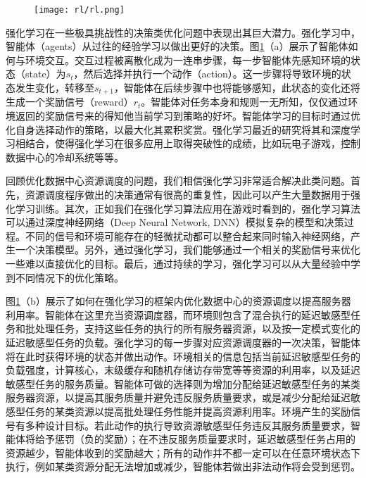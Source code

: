 \begin{figure}
  \centering
  \begin{minipage}[b]{0.7\textwidth}
    \centering
    \texttt{[image: rl/rl.png]}
    \label{fig:rl}
  \end{minipage}     
\end{figure}


强化学习在一些极具挑战性的决策类优化问题中表现出其巨大潜力\cite{mnih2013playing}\cite{silver2016mastering}。强化学习中，智能体（agents）从过往的经验学习以做出更好的决策。图\ref{fig:rl}（a）展示了智能体如何与环境交互。交互过程被离散化成为一连串步骤，每一步智能体先感知环境的状态（state）为$s_t$，然后选择并执行一个动作（action）。这一步骤将导致环境的状态发生变化，转移至$s_{t+1}$，智能体在后续步骤中也将能够感知，此状态的变化还将生成一个奖励信号（reward）$r_t$。智能体对任务本身和规则一无所知，仅仅通过环境返回的奖励信号来的得知他当前学习到策略的好坏\cite{bertsekas1995dynamic}。智能体学习的目标时通过优化自身选择动作的策略，以最大化其累积奖赏。强化学习最近的研究将其和深度学习相结合，使得强化学习在很多应用上取得突破性的成绩，比如玩电子游戏\cite{mnih2015human}，控制数据中心的冷却系统\cite{evans2016deepmind}等等。

回顾优化数据中心资源调度的问题，我们相信强化学习非常适合解决此类问题。首先，资源调度程序做出的决策通常有很高的重复性，因此可以产生大量数据用于强化学习训练。其次，正如我们在强化学习算法应用在游戏\cite{mnih2015human}\cite{evans2016deepmind}时看到的，强化学习算法可以通过深度神经网络（Deep Neural Network, DNN）模拟复杂的模型和决策过程。不同的信号和环境可能存在的轻微扰动都可以整合起来同时输入神经网络，产生一个决策模型。另外，通过强化学习，我们能够通过一个相关的奖励信号来优化一些难以直接优化的目标。最后，通过持续的学习，强化学习可以从大量经验中学到不同情况下的优化策略。

图\ref{fig:rl}（b）展示了如何在强化学习的框架内优化数据中心的资源调度以提高服务器利用率。智能体在这里充当资源调度器，而环境则包含了混合执行的延迟敏感型任务和批处理任务，支持这些任务的执行的所有服务器资源，以及按一定模式变化的延迟敏感型任务的负载。强化学习的每一步骤对应资源调度器的一次决策，智能体将在此时获得环境的状态并做出动作。环境相关的信息包括当前延迟敏感型任务的负载强度，计算核心，末级缓存和随机存储访存带宽等等资源的利用率，以及延迟敏感型任务的服务质量。智能体可做的选择则为增加分配给延迟敏感型任务的某类服务器资源，以提高其服务质量并避免违反服务质量要求，或是减少分配给延迟敏感型任务的某类资源以提高批处理任务性能并提高资源利用率。环境产生的奖励信号有多种设计目标。若此动作的执行导致资源敏感型任务违反其服务质量要求，智能体将给予惩罚（负的奖励）；在不违反服务质量要求时，延迟敏感型任务占用的资源越少，智能体收到的奖励越大；所有的动作并不都一定可以在任意环境状态下执行，例如某类资源分配无法增加或减少，智能体若做出非法动作将会受到惩罚。

